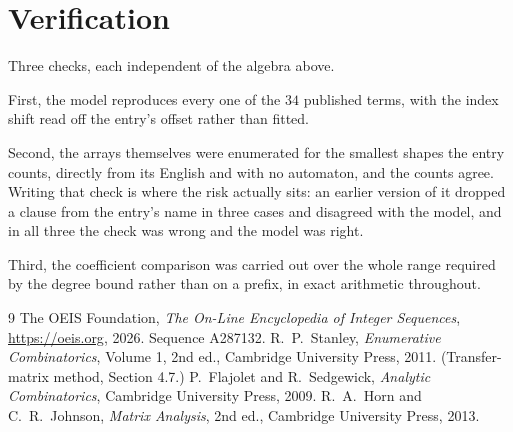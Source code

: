 \documentclass[11pt,a4paper]{article}
\theoremstyle{plain}
\theoremstyle{definition}
\begin{document}
\section{Verification}

Three checks, each independent of the algebra above.

First, the model reproduces every one of the $34$ published terms, with the index shift
read off the entry's offset rather than fitted.

Second, the arrays themselves were enumerated for the smallest shapes the entry counts,
directly from its English and with no automaton, and the counts agree. Writing that check is
where the risk actually sits: an earlier version of it dropped a clause from the entry's name
in three cases and disagreed with the model, and in all three the check was wrong and the model
was right.

Third, the coefficient comparison was carried out over the whole range required by the degree
bound rather than on a prefix, in exact arithmetic throughout.

\begin{thebibliography}{9}
 The OEIS Foundation, \emph{The On-Line Encyclopedia of Integer
Sequences}, \url{https://oeis.org}, 2026. Sequence A287132.
 R.~P.~Stanley, \emph{Enumerative Combinatorics}, Volume 1, 2nd ed.,
Cambridge University Press, 2011. (Transfer-matrix method, Section 4.7.)
 P.~Flajolet and R.~Sedgewick, \emph{Analytic Combinatorics}, Cambridge
University Press, 2009.
 R.~A.~Horn and C.~R.~Johnson, \emph{Matrix Analysis}, 2nd ed., Cambridge
University Press, 2013.
\end{thebibliography}
\end{document}
